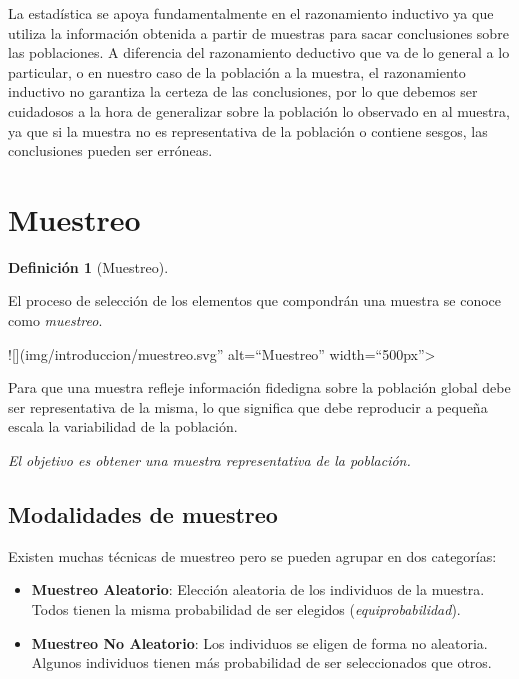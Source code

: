 \documentclass[
  spanish,
  a4paper,
]{scrreport}
\theoremstyle{plain}
\theoremstyle{definition}
\theoremstyle{definition}
\newtheorem{definition}{Definición}[chapter]
\theoremstyle{remark}
\begin{document}
La estadística se apoya fundamentalmente en el razonamiento inductivo ya
que utiliza la información obtenida a partir de muestras para sacar
conclusiones sobre las poblaciones. A diferencia del razonamiento
deductivo que va de lo general a lo particular, o en nuestro caso de la
población a la muestra, el razonamiento inductivo no garantiza la
certeza de las conclusiones, por lo que debemos ser cuidadosos a la hora
de generalizar sobre la población lo observado en al muestra, ya que si
la muestra no es representativa de la población o contiene sesgos, las
conclusiones pueden ser erróneas.

\section{Muestreo}\label{muestreo}

\begin{definition}[Muestreo]\protect\hypertarget{def-muestreo}{}\label{def-muestreo}

El proceso de selección de los elementos que compondrán una muestra se
conoce como \emph{muestreo}.

\end{definition}

!{[}{]}(img/introduccion/muestreo.svg'' alt=``Muestreo''
width=``500px''\textgreater{}

Para que una muestra refleje información fidedigna sobre la población
global debe ser representativa de la misma, lo que significa que debe
reproducir a pequeña escala la variabilidad de la población.

\emph{El objetivo es obtener una muestra representativa de la
población.}

\subsection{Modalidades de muestreo}\label{modalidades-de-muestreo}

Existen muchas técnicas de muestreo pero se pueden agrupar en dos
categorías:

\begin{itemize}
\item
  \textbf{Muestreo Aleatorio}: Elección aleatoria de los individuos de
  la muestra. Todos tienen la misma probabilidad de ser elegidos
  (\emph{equiprobabilidad}).
\item
  \textbf{Muestreo No Aleatorio}: Los individuos se eligen de forma no
  aleatoria. Algunos individuos tienen más probabilidad de ser
  seleccionados que otros.
\end{itemize}
\end{document}
